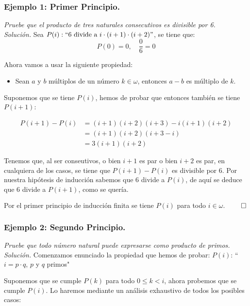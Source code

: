 \documentclass[a4paper]{article}
\theoremstyle{plain} \newtheorem{PrimerPrincipio}{Teorema}
\theoremstyle{plain} \newtheorem{SegundoPrincipio}{Teorema}
\begin{document}
\subsubsection*{Ejemplo 1: Primer Principio.} \emph{Pruebe que el producto de tres naturales consecutivos es divisible por 6.}\\

\emph{Solución.} Sea $P(i): ``6 \text{ divide a } i\cdot(i+1)\cdot(i+2)"$, se tiene que:
\begin{equation*} \tag{Caso base}
	P(0) = 0,\quad \frac{0}{6}=0
\end{equation*}

Ahora vamos a usar la siguiente propiedad:
\begin{itemize}
				\item Sean $a$ y $b$ múltiplos de un número $k \in \omega$, entonces $a - b$ es múltiplo de $k$.
\end{itemize}

Suponemos que se tiene $P(i)$, hemos de probar que entonces también se tiene $P(i+1)$:

\begin{align*}
				P(i+1) - P(i) &{}=  (i+1)(i+2)(i+3) - i(i+1)(i+2)\\
											 &= (i+1)(i+2)(i + 3 - i)\\
											 &= 3(i+1)(i+2)
\end{align*}

Tenemos que, al ser conseutivos, o bien $i+1$ es par o bien $i+2$ es par, en cualquiera de los casos, se tiene que $P(i+1) - P(i)$ es divisible por $6$. Por nuestra hipótesis de inducción sabemos que 6 divide a $P(i)$, de aquí se deduce que 6 divide a $P(i+1)$, como se quería.

Por el primer principio de inducción finita se tiene $P(i)$ para todo $i\in\omega$. $\qed$

\subsubsection*{Ejemplo 2: Segundo Principio.} \emph{Pruebe que todo número natural puede expresarse como producto de primos.}\\

\emph{Solución.} Comenzamos enunciado la propiedad que hemos de probar: $P(i)$: ``$i=p\cdot q$, $p$ y $q$ primos"

Suponemos que se cumple $P(k)$ para todo $0 \le k < i$, ahora probemos que se cumple $P(i)$. Lo haremos mediante un análisis exhaustivo de todos los posibles casos:
\end{document}
